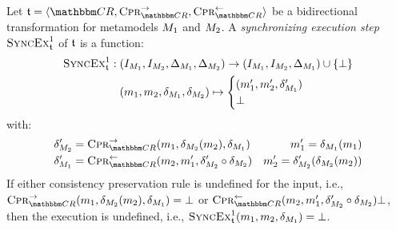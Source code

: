 \begin{definition}
    \label{def:synchronizingtransformationexecutionstep}
    Let $\transformation{t} = \tupled{\consistencyrelationset{CR}, \consistencypreservationrule{\consistencyrelationset{CR}}^{\rightarrow}, \consistencypreservationrule{\consistencyrelationset{CR}}^{\leftarrow}}$ be a bidirectional transformation for metamodels $M_{1}$ and $M_{2}$.
    A \emph{synchronizing execution step} $\textsc{SyncEx}_{\mathfrak{t}}^1$ of $\mathfrak{t}$ is a function:
    \begin{align*}
        \textsc{SyncEx}_{\mathfrak{t}}^1 : \; & (I_{M_{1}}, I_{M_{2}}, \Delta_{M_{1}}, \Delta_{M_{2}}) \rightarrow (I_{M_{1}}, I_{M_{2}}, \Delta_{M_{1}}) \cup \{ \bot \} \\
        & (m_{1}, m_{2}, \delta_{M_{1}}, \delta_{M_{2}}) \mapsto 
        \begin{cases} 
            (m_{1}', m_{2}', \delta_{M_{1}}') \\
            \bot
        \end{cases}
    \end{align*}
    with:
    \begin{align*}
        & \change{\metamodel{M}{2}}' = \consistencypreservationrule{\consistencyrelationset{CR}}^{\rightarrow}(\model{m}{1}, \change{\metamodel{M}{2}}(\model{m}{2}), \change{\metamodel{M}{1}}) %
        & \model{m}{1}' = \change{\metamodel{M}{1}}(\model{m}{1}) \\
        & \change{\metamodel{M}{1}}' = \consistencypreservationrule{\consistencyrelationset{CR}}^{\leftarrow}(\model{m}{2}, \model{m}{1}', \change{\metamodel{M}{2}}' \concatfunction \change{\metamodel{M}{2}}) %
        & \model{m}{2}' = \change{\metamodel{M}{2}}'(\change{\metamodel{M}{2}}(\model{m}{2}))
    \end{align*}
    If either consistency preservation rule is undefined for the input, i.e., $\consistencypreservationrule{\consistencyrelationset{CR}}^{\rightarrow}(\model{m}{1}, \change{\metamodel{M}{2}}(\model{m}{2}), \change{\metamodel{M}{1}}) = \bot$ or $\consistencypreservationrule{\consistencyrelationset{CR}}^{\leftarrow}(\model{m}{2}, \model{m}{1}', \change{\metamodel{M}{2}}' \concatfunction \change{\metamodel{M}{2}}) \bot$, then the execution is undefined, i.e., $\textsc{SyncEx}_{\mathfrak{t}}^1(m_{1}, m_{2}, \delta_{M_{1}}) = \bot$.

\end{definition}
